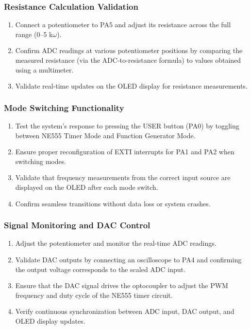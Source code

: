\subsubsection{Resistance Calculation Validation}
\begin{enumerate}[leftmargin=2em]
    \item Connect a potentiometer to PA5 and adjust its resistance across the full range (0–5 k$\omega$).
    \item Confirm ADC readings at various potentiometer positions by comparing the measured resistance (via the ADC-to-resistance formula) to values obtained using a multimeter.
    \item Validate real-time updates on the OLED display for resistance measurements.
\end{enumerate}

\subsubsection{Mode Switching Functionality}
\begin{enumerate}[leftmargin=2em]
    \item Test the system's response to pressing the USER button (PA0) by toggling between NE555 Timer Mode and Function Generator Mode.
    \item Ensure proper reconfiguration of EXTI interrupts for PA1 and PA2 when switching modes.
    \item Validate that frequency measurements from the correct input source are displayed on the OLED after each mode switch.
    \item Confirm seamless transitions without data loss or system crashes.
\end{enumerate}

\subsubsection{Signal Monitoring and DAC Control}
\begin{enumerate}[leftmargin=2em]
    \item Adjust the potentiometer and monitor the real-time ADC readings.
    \item Validate DAC outputs by connecting an oscilloscope to PA4 and confirming the output voltage corresponds to the scaled ADC input.
    \item Ensure that the DAC signal drives the optocoupler to adjust the PWM frequency and duty cycle of the NE555 timer circuit.
    \item Verify continuous synchronization between ADC input, DAC output, and OLED display updates.
\end{enumerate}

